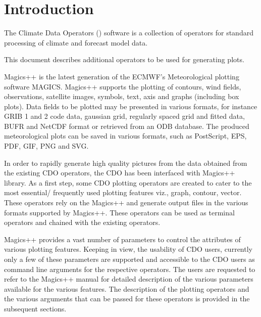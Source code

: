 \chapter{Introduction}

The Climate Data Operators ({\CDO}) software is a collection of operators
for standard processing of climate and forecast model data.

This document describes additional {\CDO} operators to be used for generating plots.

Magics++ is the latest generation of the ECMWF's Meteorological plotting software MAGICS.
Magics++ supports the plotting of contours, wind fields, observations, satellite images, symbols, text,
axis and graphs (including box plots). Data fields to be plotted may be presented in various formats, for
instance GRIB 1 and 2 code data, gaussian grid, regularly spaced grid and fitted data, BUFR and
NetCDF format or retrieved from an ODB database. The produced meteorological plots can be saved in
various formats, such as PostScript, EPS, PDF, GIF, PNG and SVG. \cite{Magics}

In order to rapidly generate high quality pictures from the data obtained from the existing CDO
operators, the CDO has been interfaced with Magics++ library. As a first step, some CDO plotting
operators are created to cater to the most essential/ frequently used plotting features viz., graph,
contour, vector. These operators rely on the Magics++ and generate output files in the various formats
supported by Magics++. These operators can be used as terminal operators and chained with the existing 
operators.

Magics++ provides a vast number of parameters to control the attributes of various plotting
features. Keeping in view, the usability of CDO users, currently only a few of these parameters are
supported and accessible to the CDO users as command line arguments for the respective operators.
The users are requested to refer to the Magics++ manual \cite{Magics} for detailed description of the various
parameters available for the various features. The description of the plotting operators and the
various arguments that can be passed for these operators is provided in the subsequent sections.
